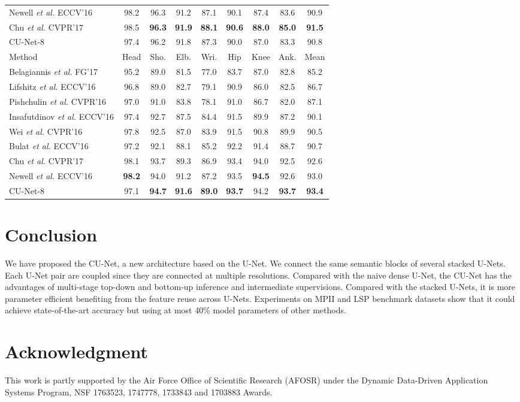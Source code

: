 \documentclass{bmvc2k}
\begin{document}
\begin{table}[t!]
\begin{center}
\begin{tabular}{@{}lcccccccc@{}}
Newell {\it et al.}  ECCV'16 \cite{newell2016stacked} & 98.2 & 96.3 & 91.2 & 87.1 & 90.1 & 87.4 & 83.6 & 90.9\\
Chu \textit{et al.} CVPR'17 \cite{chu2017multi} & 98.5 & {\bf 96.3} & {\bf 91.9} & {\bf 88.1} & {\bf 90.6} & {\bf 88.0} & {\bf 85.0} & {\bf 91.5}\\
\hline
CU-Net-8 & 97.4 & 96.2  & 91.8  & 87.3  & 90.0  & 87.0 & 83.3 & 90.8\\
\bottomrule
\toprule
Method & Head & Sho. & Elb. & Wri. & Hip & Knee & Ank. & Mean\\
\hline
Belagiannis \textit{et al.} FG'17 \cite{belagiannis2017recurrent} & 95.2 & 89.0 & 81.5 & 77.0 & 83.7 & 87.0 & 82.8 & 85.2\\
Lifshitz \textit{et al.} ECCV'16 \cite{lifshitz2016human} & 96.8 & 89.0 & 82.7 & 79.1 & 90.9 & 86.0 & 82.5 & 86.7\\
Pishchulin \textit{et al.} CVPR'16 \cite{pishchulin2016deepcut} &  97.0 & 91.0 & 83.8 & 78.1 & 91.0 & 86.7 & 82.0 & 87.1\\
Insafutdinov \textit{et al.} ECCV'16 \cite{insafutdinov2016deepercut}& 97.4 & 92.7 & 87.5 & 84.4 & 91.5 & 89.9 & 87.2 & 90.1\\
Wei \textit{et al.} CVPR'16 \cite{wei2016convolutional}& 97.8 & 92.5 & 87.0 & 83.9 & 91.5 & 90.8 & 89.9 & 90.5\\
Bulat \textit{et al.} ECCV'16 \cite{bulat2016human}& 97.2 & 92.1 & 88.1 & 85.2 & 92.2 & 91.4 & 88.7 & 90.7\\
Chu \textit{et al.} CVPR'17 \cite{chu2017multi}& 98.1 & 93.7 & 89.3 & 86.9 &  93.4 & 94.0 & 92.5 & 92.6\\
Newell {\it et al.} ECCV'16 \cite{newell2016stacked} & {\bf 98.2} & 94.0 & 91.2 & 87.2 & 93.5 & {\bf 94.5} & 92.6 & 93.0\\
\hline
CU-Net-8 & 97.1 &  {\bf 94.7} & {\bf 91.6} & {\bf 89.0}  & {\bf 93.7} & 94.2 & {\bf 93.7}  & {\bf 93.4}\\
\bottomrule
\end{tabular}
\end{center}
\vspace{-10pt}
\end{table} \section{Conclusion}
We have proposed the CU-Net, a new architecture based on the U-Net. We connect the same semantic blocks of several stacked U-Nets. Each U-Net pair are coupled since they are connected at multiple resolutions. Compared with the naive dense U-Net, the CU-Net has the advantages of multi-stage top-down and bottom-up inference and intermediate supervisions. Compared with the stacked U-Nets, it is more parameter efficient benefiting from the feature reuse across U-Nets. Experiments on MPII and LSP benchmark datasets show that it could achieve state-of-the-art accuracy but using at most 40\% model parameters of other methods.
%
 \section{Acknowledgment}
This work is partly supported by the Air Force Office of Scientific Research (AFOSR) under the Dynamic Data-Driven Application Systems Program, NSF 1763523, 1747778, 1733843 and 1703883 Awards. 
\end{document}
